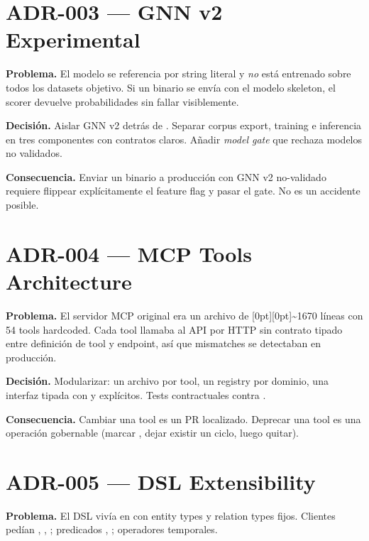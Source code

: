 \section{ADR-003 — GNN v2 Experimental}

\textbf{Problema.} El modelo  se referencia
por string literal y \emph{no} está entrenado sobre todos los
datasets objetivo. Si un binario se envía con el modelo skeleton,
el scorer devuelve probabilidades sin fallar visiblemente.

\textbf{Decisión.} Aislar GNN v2 detrás de
. Separar corpus export,
training e inferencia en tres componentes con contratos claros.
Añadir \emph{model gate} que rechaza modelos no validados.

\textbf{Consecuencia.} Enviar un binario a producción con GNN v2
no-validado requiere flippear explícitamente el feature flag y
pasar el gate. No es un accidente posible.

\section{ADR-004 — MCP Tools Architecture}

\textbf{Problema.} El servidor MCP original era un archivo de
\raisebox{0pt}[0pt][0pt]{\textasciitilde}1670 líneas con 54 tools
hardcoded. Cada tool llamaba al API por HTTP sin contrato tipado
entre definición de tool y endpoint, así que mismatches se
detectaban en producción.

\textbf{Decisión.} Modularizar: un archivo por tool, un registry
por dominio, una interfaz  tipada con
 y  explícitos. Tests contractuales
contra .

\textbf{Consecuencia.} Cambiar una tool es un PR localizado.
Deprecar una tool es una operación gobernable (marcar
, dejar existir un ciclo, luego quitar).

\section{ADR-005 — DSL Extensibility}

\textbf{Problema.} El DSL vivía en
 con entity types y
relation types fijos. Clientes pedían ,
, ; predicados ,
; operadores temporales.

